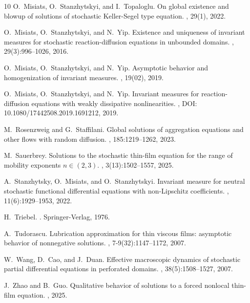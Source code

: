 \documentclass[a4paper,12pt]{article}
\numberwithin{equation}{section}
\begin{document}
\begin{thebibliography}{10}
O.~Misiats, O.~Stanzhytskyi, and I.~Topaloglu.
\newblock On global existence and blowup of solutions of stochastic
  {K}eller-{S}egel type equation.
, 29(1), 2022.

O.~Misiats, O.~Stanzhytskyi, and N.~Yip.
\newblock Existence and uniqueness of invariant measures for stochastic
  reaction-diffusion equations in unbounded domains.
, 29(3):996--1026, 2016.

O.~Misiats, O.~Stanzhytskyi, and N.~Yip.
\newblock Asymptotic behavior and homogenization of invariant measures.
, 19(02), 2019.

O.~Misiats, O.~Stanzhytskyi, and N.~Yip.
\newblock Invariant measures for reaction-diffusion equations with weakly
  dissipative nonlinearities.
, DOI: 10.1080/17442508.2019.1691212, 2019.

M.~Rosenzweig and G.~Staffilani.
\newblock Global solutions of aggregation equations and other flows with random
  diffusion.
, 185:1219--1262, 2023.

M.~Sauerbrey.
\newblock Solutions to the stochastic thin-film equation for the range of
  mobility exponents $n \in (2,3)$.
, 3(13):1502--1557, 2025.

A.~Stanzhytsky, O.~Misiats, and O.~Stanzhytskyi.
\newblock Invariant measure for neutral stochastic functional differential
  equations with non-{L}ipschitz coefficients.
, 11(6):1929--1953, 2022.

H.~Triebel.
.
\newblock Springer-Verlag, 1976.

A.~Tudorascu.
\newblock Lubrication approximation for thin viscous films: asymptotic behavior
  of nonnegative solutions.
, 7-9(32):1147--1172, 2007.

W.~Wang, D.~Cao, and J.~Duan.
\newblock Effective macroscopic dynamics of stochastic partial differential
  equations in perforated domains.
, 38(5):1508--1527, 2007.

J.~Zhao and B.~Guo.
\newblock Qualitative behavior of solutions to a forced nonlocal thin-film
  equation.
, 2025.

\end{thebibliography}
\end{document}
